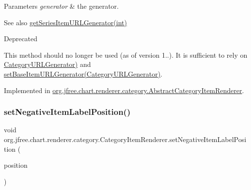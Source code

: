 \begin{DoxyParams}{Parameters}
{\em generator} & the generator.\\
\hline
\end{DoxyParams}
\begin{DoxySeeAlso}{See also}
\mbox{\hyperlink{interfaceorg_1_1jfree_1_1chart_1_1renderer_1_1category_1_1_category_item_renderer_a64d80a830a7a1e182659b29054f9c4fb}{get\+Series\+Item\+U\+R\+L\+Generator(int)}}
\end{DoxySeeAlso}
\begin{DoxyRefDesc}{Deprecated}
\item[\mbox{\hyperlink{deprecated__deprecated000180}{Deprecated}}]This method should no longer be used (as of version 1..). It is sufficient to rely on \mbox{\hyperlink{}{Category\+U\+R\+L\+Generator)}} and \mbox{\hyperlink{interfaceorg_1_1jfree_1_1chart_1_1renderer_1_1category_1_1_category_item_renderer_a4400119df0df9fa629f6b0b630da4bb5}{set\+Base\+Item\+U\+R\+L\+Generator(\+Category\+U\+R\+L\+Generator)}}. \end{DoxyRefDesc}


Implemented in \mbox{\hyperlink{classorg_1_1jfree_1_1chart_1_1renderer_1_1category_1_1_abstract_category_item_renderer_a2c58205b64cd00e63f486d160cf77bfd}{org.\+jfree.\+chart.\+renderer.\+category.\+Abstract\+Category\+Item\+Renderer}}.

\mbox{\label{interfaceorg_1_1jfree_1_1chart_1_1renderer_1_1category_1_1_category_item_renderer_acda1ea9e4c2f56fd66994a59c0f4c60a}} 
\subsubsection{\texorpdfstring{set\+Negative\+Item\+Label\+Position()}{setNegativeItemLabelPosition()}\hspace{0.1cm}{\footnotesize\ttfamily [1/2]}}
{\footnotesize\ttfamily void org.\+jfree.\+chart.\+renderer.\+category.\+Category\+Item\+Renderer.\+set\+Negative\+Item\+Label\+Position (\begin{DoxyParamCaption}\item[{\mbox{\hyperlink{classorg_1_1jfree_1_1chart_1_1labels_1_1_item_label_position}{Item\+Label\+Position}}}]{position }\end{DoxyParamCaption})}

